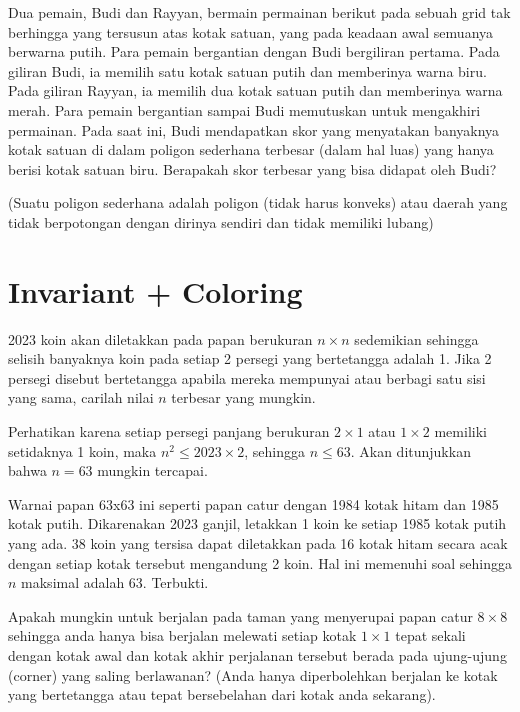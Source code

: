\documentclass[12pt]{scrartcl}
\begin{document}
\begin{soaljawab}
Dua pemain, Budi dan Rayyan, bermain permainan berikut pada sebuah grid tak berhingga yang tersusun atas kotak satuan, yang pada keadaan awal semuanya berwarna putih. Para pemain bergantian dengan Budi bergiliran pertama. Pada giliran Budi, ia memilih satu kotak satuan putih dan memberinya warna biru. Pada giliran Rayyan, ia memilih dua kotak satuan putih dan memberinya warna merah. Para pemain bergantian sampai Budi memutuskan untuk mengakhiri permainan. Pada saat ini, Budi mendapatkan skor yang menyatakan banyaknya kotak satuan di dalam poligon sederhana terbesar (dalam hal luas) yang hanya berisi kotak satuan biru. Berapakah skor terbesar yang bisa didapat oleh Budi?

(Suatu poligon sederhana adalah poligon (tidak harus konveks) atau daerah yang tidak berpotongan dengan dirinya sendiri dan tidak memiliki lubang)
\end{soaljawab}

\section{Invariant + Coloring}
\begin{soaljawab}
    2023 koin akan diletakkan pada papan berukuran $n \times n$ sedemikian sehingga selisih banyaknya koin pada setiap 2 persegi yang bertetangga adalah 1. Jika 2 persegi disebut bertetangga apabila mereka mempunyai atau berbagi satu sisi yang sama, carilah nilai $n$ terbesar yang mungkin.
        \begin{solusi}
        Perhatikan karena setiap persegi panjang berukuran $2 \times 1$ atau $1 \times 2$ memiliki setidaknya 1 koin, maka $n^2 \le 2023 \times 2$, sehingga $n \le 63$. Akan ditunjukkan bahwa $n=63$ mungkin tercapai.

        Warnai papan 63x63 ini seperti papan catur dengan 1984 kotak hitam dan 1985 kotak putih. Dikarenakan 2023 ganjil, letakkan 1 koin ke setiap 1985 kotak putih yang ada. 38 koin yang tersisa dapat diletakkan pada 16 kotak hitam secara acak dengan setiap kotak tersebut mengandung 2 koin. Hal ini memenuhi soal sehingga $n$ maksimal adalah 63. Terbukti.
    \end{solusi}
\end{soaljawab}

\begin{soaljawab}
    Apakah mungkin untuk berjalan pada taman yang menyerupai papan catur $8 \times 8$ sehingga anda hanya bisa berjalan melewati setiap kotak $1 \times 1$ tepat sekali dengan kotak awal dan kotak akhir perjalanan tersebut berada pada ujung-ujung (corner) yang saling berlawanan? (Anda hanya diperbolehkan berjalan ke kotak yang bertetangga atau tepat bersebelahan dari kotak anda sekarang).
\end{soaljawab}
\end{document}
